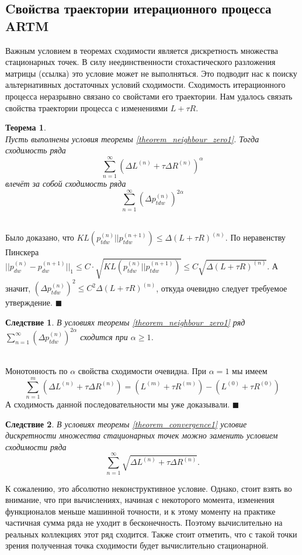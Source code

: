 \documentclass[12pt]{article}
\newtheorem{theorem}{Теорема}
\newtheorem{conseq}{Следствие}[theorem]
\newenvironment{Proof} 
	{\par\noindent{\bf Доказательство.}} 
	{\hfill$\blacksquare$}
\renewcommand{\leq}{\leqslant}
\renewcommand{\geq}{\geqslant}
\begin{document}
	\subsection{Cвойства траектории итерационного процесса ARTM}
Важным условием в теоремах сходимости является дискретность множества стационарных точек. В силу неединственности стохастического разложения матрицы (ссылка) это условие может не выполняться. Это подводит нас к поиску альтернативных достаточных условий сходимости. Сходимость итерационного процесса неразрывно связано со свойстами его траектории. Нам удалось связать свойства траектории процесса с изменениями $L + \tau R$.
\begin{theorem} \label{theorem_series}\ \\
	Пусть выполнены условия теоремы \ref{theorem_neighbour_zero1}. Тогда сходимость ряда
	\[
		\sum\limits_{n=1}^{\infty} (\Delta L^{(n)} + \tau \Delta R^{(n)})^{\alpha}
	\]
	влечёт за собой сходимость ряда
	\[
		\sum\limits_{n=1}^{\infty} (\Delta p_{tdw}^{(n)})^{2 \alpha}
	\]
\end{theorem}
\begin{Proof}\ \\
Было доказано, что $KL(p_{tdw}^{(n)}||p_{tdw}^{(n + 1)}) \leq \Delta (L + \tau R)^{(n)}$. По неравенству Пинскера $|| p_{dw}^{(n)} - p_{dw}^{(n+1)}||_1 \leq C \cdot \sqrt{KL(p_{tdw}^{(n)}||p_{tdw}^{(n+1)})} \leq C \sqrt{\Delta (L + \tau R)^{(n)}}$. А значит, $ (\Delta p_{tdw}^{(n)})^{2} \leq C^2 \Delta (L + \tau R)^{(n)} $, откуда очевидно следует требуемое утверждение.
\end{Proof}\ \\
\begin{conseq}
В условиях теоремы  \ref{theorem_neighbour_zero1} ряд  $\sum\limits_{n=1}^{\infty} (\Delta p_{tdw}^{(n)})^{2 \alpha}$ сходится при $\alpha \geq 1$.
\end{conseq}
\begin{Proof}\ \\
Монотонность по $\alpha$ свойства сходимости очевидна. При $\alpha=1$ мы имеем
\[
\sum\limits_{n=1}^{m} (\Delta L^{(n)} + \tau \Delta R^{(n)}) = ( L^{(m)} + \tau R^{(m)}) - ( L^{(0)} + \tau R^{(0)})
\]
А сходимость данной последовательности мы уже доказывали.
\end{Proof}\ \\
\begin{conseq}
В условиях теоремы  \ref{theorem_convergence1} условие дискретности множества стационарных точек можно заменить условием сходимости ряда
\[
\sum\limits_{n=1}^{\infty} \sqrt{\Delta L^{(n)} + \tau \Delta R^{(n)}}.
\]
\end{conseq}
К сожалению, это абсолютно неконструктивное условие. Однако, стоит взять во внимание, что при вычислениях, начиная с некоторого момента, изменения функционалов меньше машинной точности, и к этому моменту на практике частичная сумма ряда не уходит в бесконечность. Поэтому вычислительно на реальных коллекциях этот ряд сходится. Также стоит отметить, что с такой точки зрения полученная точка  сходимости будет вычислительно стационарной.
\end{document}
